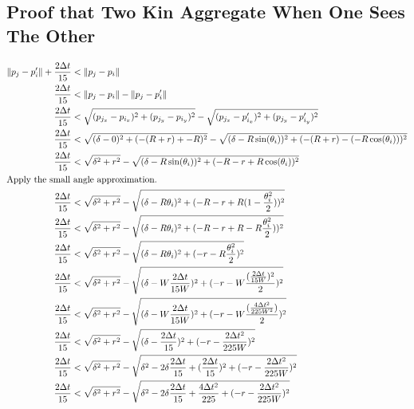 \documentclass[conference]{IEEEtran}
\begin{document}
  \subsection{Proof that Two Kin Aggregate When One Sees The Other} \label{thm:two_agg}
    {%
      \setlength{\belowdisplayskip}{3pt}%
      \setlength{\abovedisplayskip}{3pt}%
      \begin{align*}
        \lVert p_j - p'_i \rVert + \frac{2\Delta t}{15} &< \lVert p_j - p_i \rVert \\
        \frac{2\Delta t}{15} &< \lVert p_j - p_i \rVert - \lVert p_j - p'_i \rVert \\
        \frac{2\Delta t}{15} &< \sqrt{(p_{j_x} - p_{i_x})^2 + (p_{j_y} - p_{i_y})^2} - \sqrt{(p_{j_x} - p'_{i_x})^2 + (p_{j_y} - p'_{i_y})^2} \\
        \frac{2\Delta t}{15} &< \sqrt{(\delta - 0)^2 + (-(R+r)+-R)^2} - \sqrt{(\delta - R\sin(\theta_i))^2 + (-(R+r) - (-R\cos(\theta_i)))^2} \\
        \frac{2\Delta t}{15} &< \sqrt{\delta^2 + r^2} - \sqrt{(\delta - R\sin(\theta_i))^2 + (-R -r + R\cos(\theta_i))^2} \\
        \intertext{Apply the small angle approximation.}
        \frac{2\Delta t}{15} &< \sqrt{\delta^2 + r^2}-\sqrt{(\delta - R\theta_i)^2 + (-R - r + R(1-\frac{\theta_i^2}{2}))^2} \\
        \frac{2\Delta t}{15} &< \sqrt{\delta^2 + r^2}-\sqrt{(\delta - R\theta_i)^2 + (-R - r + R - R\frac{\theta_i^2}{2}))^2} \\
        \frac{2\Delta t}{15} &< \sqrt{\delta^2 + r^2}-\sqrt{(\delta - R\theta_i)^2 + (-r - R\frac{\theta_i^2}{2})^2} \\
        \frac{2\Delta t}{15} &< \sqrt{\delta^2 + r^2}-\sqrt{(\delta - W\frac{2\Delta t}{15W})^2 + (-r - W\frac{(\frac{2\Delta t}{15W})^2}{2})^2} \\
        \frac{2\Delta t}{15} &< \sqrt{\delta^2 + r^2}-\sqrt{(\delta - W\frac{2\Delta t}{15W})^2 + (-r - W\frac{(\frac{4\Delta t^2}{225W^2})}{2})^2} \\
        \frac{2\Delta t}{15} &< \sqrt{\delta^2 + r^2}-\sqrt{(\delta - \frac{2\Delta t}{15})^2 + (-r - \frac{2\Delta t^2}{225W})^2} \\
        \frac{2\Delta t}{15} &< \sqrt{\delta^2 + r^2}-\sqrt{\delta^2-2\delta\frac{2\Delta t}{15}+(\frac{2\Delta t}{15})^2+(-r-\frac{2\Delta t^2}{225W})^2} \\
        \frac{2\Delta t}{15} &< \sqrt{\delta^2 + r^2}-\sqrt{\delta^2-2\delta\frac{2\Delta t}{15}+\frac{4\Delta t^2}{225}+(-r-\frac{2\Delta t^2}{225W})^2} \\

\end{align*}}
\end{document}
